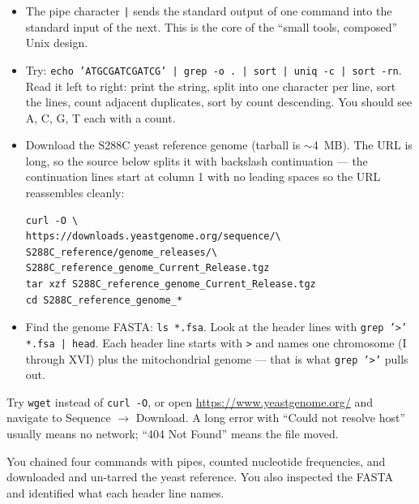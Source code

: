 \begin{itemize}[nosep]
  \item The pipe character \texttt{|} sends the standard output of one command into the standard input of the next. This is the core of the ``small tools, composed'' Unix design.
  \item Try: \texttt{echo 'ATGCGATCGATCG' | grep -o . | sort | uniq -c | sort -rn}. Read it left to right: print the string, split into one character per line, sort the lines, count adjacent duplicates, sort by count descending. You should see A, C, G, T each with a count.
  \item Download the S288C yeast reference genome (tarball is $\sim$4~MB). The URL is long, so the source below splits it with backslash continuation --- the continuation lines start at column 1 with no leading spaces so the URL reassembles cleanly:
    \begin{lstlisting}
curl -O \
https://downloads.yeastgenome.org/sequence/\
S288C_reference/genome_releases/\
S288C_reference_genome_Current_Release.tgz
tar xzf S288C_reference_genome_Current_Release.tgz
cd S288C_reference_genome_*
    \end{lstlisting}
  \item Find the genome FASTA: \texttt{ls *.fsa}. Look at the header lines with \texttt{grep '>' *.fsa | head}. Each header line starts with \texttt{>} and names one chromosome (I through XVI) plus the mitochondrial genome --- that is what \texttt{grep '>'} pulls out.
\end{itemize}
\begin{tipbox}[If \texttt{curl} fails or the URL has changed]
Try \texttt{wget} instead of \texttt{curl -O}, or open \url{https://www.yeastgenome.org/} and navigate to Sequence $\to$ Download. A long error with ``Could not resolve host'' usually means no network; ``404 Not Found'' means the file moved.
\end{tipbox}
\begin{winbox}[Checkpoint]
You chained four commands with pipes, counted nucleotide frequencies, and downloaded and un-tarred the yeast reference. You also inspected the FASTA and identified what each header line names.
\end{winbox}

